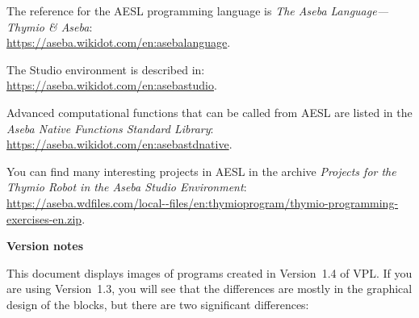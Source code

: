\documentclass[11pt,a4paper,english]{report}
\begin{document}
The reference for the AESL programming language is
\textit{The Aseba Language---Thymio \& Aseba}:\\
\url{https://aseba.wikidot.com/en:asebalanguage}.

The Studio environment is described in:
\url{https://aseba.wikidot.com/en:asebastudio}.

Advanced computational functions that can be called from AESL are listed
in the \textit{Aseba Native Functions Standard Library}:\\ 
\url{https://aseba.wikidot.com/en:asebastdnative}.

You can find many interesting projects in AESL in the archive
\textit{Projects for the Thymio Robot in the Aseba Studio
Environment}:\\
\url{https://aseba.wdfiles.com/local--files/en:thymioprogram/thymio-programming-exercises-en.zip}.


\newpage

\textbf{\large Version notes}

This document displays images of programs created in Version~1.4 of VPL.
If you are using Version~1.3, you will see that the differences are
mostly in the graphical design of the blocks, but there are two
significant differences:
\end{document}

